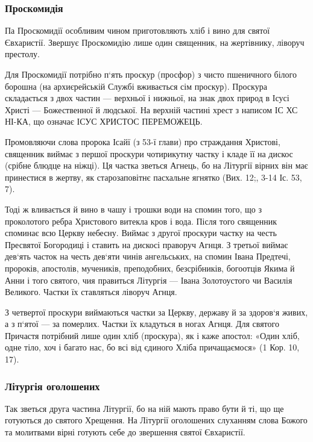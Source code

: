 \documentclass[main.tex]{subfiles}
\begin{document}
\subsubsection{Проскомидія}

Па Проскомидії особливим чином приготовляють хліб і вино для святої Євхаристії. Звершує Проскомидію лише один священник, на жертівнику, ліворуч престолу.

Для Проскомидії потрібно п`ять проскур (просфор) з чисто пшеничного білого борошна (на архиєрейській Службі вживається сім проскур). Проскура складається з двох частин — верхньої і нижньої, на знак двох природ в Ісусі Христі — Божественної й людської. На верхній частині хрест з написом ІС ХС НІ-КА, що означає ІСУС ХРИСТОС ПЕРЕМОЖЕЦЬ.

Промовляючи слова пророка Ісайї (з 53-ї глави) про страждання Христові, священник виймає з першої проскури чотирикутну частку і кладе її на дискос (срібне блюдце на ніжці). Ця частка зветься Агнець, бо на Літургії вірних він має принестися в жертву, як старозаповітнє пасхальне ягнятко (Вих. 12;, 3-14 Іс. 53, 7).

Тоді ж вливається й вино в чашу і трошки води на спомин того, що з проколотого ребра Христового витекла кров і вода.
Після того священник споминає всю Церкву небесну. Виймає з другої проскури частку на честь Пресвятої Богородиці і ставить на дискосі праворуч Агнця. З третьої виймає дев`ять часток на честь дев`яти чинів ангельських, на спомин Івана Предтечі, пророків, апостолів, мучеників, преподобних, безсрібників, богоотців Якима й Анни і того святого, чия правиться Літургія — Івана Золотоустого чи Василія Великого. Частки їх ставляться ліворуч Агнця.

З четвертої проскури виймаються частки за Церкву, державу й за здоров`я живих, а з п`ятої — за померлих. Частки їх кладуться в ногах Агнця.
Для святого Причастя потрібний лише один хліб (проскура), як і каже апостол: «Один хліб, одне тіло, хоч і багато нас, бо всі від єдиного Хліба причащаємося» (1 Кор. 10, 17).

\subsubsection{Літургія оголошених}

Так зветься друга частина Літургії, бо на ній мають право бути й ті, що ще готуються до святого Хрещення. На Літургії оголошених слуханням слова Божого та молитвами вірні готують себе до звершення святої Євхаристії.
\end{document}
